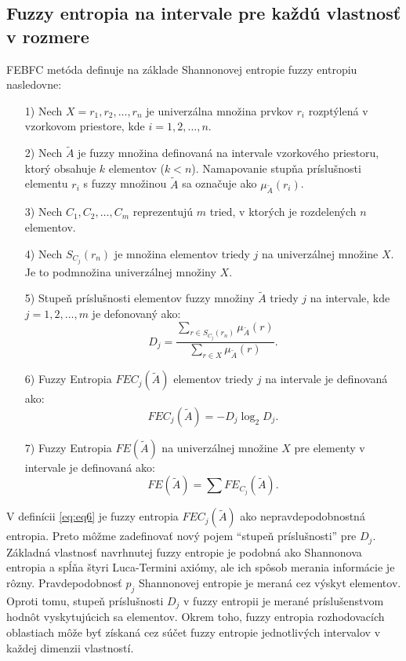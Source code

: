 \subsection{Fuzzy entropia na intervale pre každú vlastnosť v rozmere}
FEBFC metóda definuje na základe Shannonovej entropie fuzzy entropiu nasledovne: 
\begin{itemize}
\item[1)] Nech $X={r_1,r_2,\ldots,r_n}$ je univerzálna množina prvkov $r_i$ rozptýlená v vzorkovom priestore, kde   $i=1,2, \ldots, n$. 

\item[2)]
Nech $\tilde{A}$  je fuzzy množina definovaná na intervale vzorkového priestoru, ktorý obsahuje $k$ elementov ($k<n$). Namapovanie stupňa príslušnosti elementu $r_i$
 s fuzzy množinou $\tilde{A}$  sa označuje ako 
$\mu_{\tilde{A}}(r_i)$. 

\item[3)]
Nech $C_1, C_2, \ldots,C_m$  reprezentujú $m$  tried, v ktorých je rozdelených $n$ elementov. 
 
\item[4)]
Nech $S_{C_j}(r_n)$  je množina elementov triedy  $j$  na univerzálnej množine $X$.
Je to podmnožina univerzálnej množiny $X$. 

\item[5)]
Stupeň príslušnosti elementov fuzzy množiny $\tilde{A}$
 triedy $j$ na intervale, kde $j=1,2,\ldots,m$
je defonovaný ako: 
\begin{equation}
{D_j} = \frac{
\sum\limits_{r\in S_{C_j}(r_n)}
\mu_{\tilde{A}}(r)
}{
\sum\limits_{r \in X}
\mu_{\tilde{A}}
\left(r\right)
}. 
\end{equation}

\item[6)]
Fuzzy Entropia $FEC_j(\tilde{A})$ elementov triedy $j$
 na intervale je definovaná ako: 
\begin{equation}\label{eq:eq6}
FEC_j(\tilde{A}) = -D_j \log_2D_j.
\end{equation}
\item[7)]
Fuzzy Entropia $FE(\tilde{A})$ na univerzálnej množine $X$
pre elementy v intervale je definovaná ako: 
$$
FE(\tilde{A}) = \sum\limits FE_{C_j}(\tilde{A}). 
$$

\end{itemize}

 V definícii \ref{eq:eq6} je fuzzy entropia $FEC_j(\tilde{A})$  ako nepravdepodobnostná entropia. Preto môžme zadefinovať nový pojem “stupeň príslušnosti” pre $D_j$. Základná vlastnosť navrhnutej fuzzy entropie je podobná ako Shannonova entropia a spĺňa štyri Luca-Termini axiómy, ale ich spôsob merania informácie je rôzny. Pravdepodobnosť $p_j$ Shannonovej entropie je meraná cez výskyt elementov. Oproti tomu, stupeň príslušnosti $D_j$ v fuzzy entropii je merané príslušenstvom hodnôt vyskytujúcich sa elementov. Okrem toho, fuzzy entropia rozhodovacích oblastiach môže byť získaná cez súčet fuzzy entropie jednotlivých intervalov v každej dimenzii vlastností. 
 

